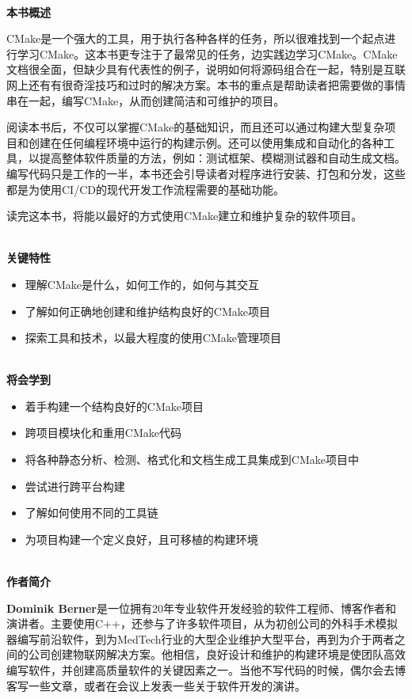 \documentclass[11pt,a4paper,UTF8]{book}
\begin{document}
\begin{sloppypar}
	\hspace*{\fill} \\ %
	\noindent\textbf{本书概述}
	
	CMake是一个强大的工具，用于执行各种各样的任务，所以很难找到一个起点进行学习CMake。这本书更专注于了最常见的任务，边实践边学习CMake。CMake文档很全面，但缺少具有代表性的例子，说明如何将源码组合在一起，特别是互联网上还有有很奇淫技巧和过时的解决方案。本书的重点是帮助读者把需要做的事情串在一起，编写CMake，从而创建简洁和可维护的项目。
	
	阅读本书后，不仅可以掌握CMake的基础知识，而且还可以通过构建大型复杂项目和创建在任何编程环境中运行的构建示例。还可以使用集成和自动化的各种工具，以提高整体软件质量的方法，例如：测试框架、模糊测试器和自动生成文档。编写代码只是工作的一半，本书还会引导读者对程序进行安装、打包和分发，这些都是为使用CI/CD的现代开发工作流程需要的基础功能。
	
	读完这本书，将能以最好的方式使用CMake建立和维护复杂的软件项目。
	
	
	\hspace*{\fill} \\ %
	\noindent\textbf{关键特性}
	\begin{itemize}
		\item 理解CMake是什么，如何工作的，如何与其交互
		\item 了解如何正确地创建和维护结构良好的CMake项目
		\item 探索工具和技术，以最大程度的使用CMake管理项目
	\end{itemize}

	\hspace*{\fill} \\ %
	\noindent\textbf{将会学到}
	\begin{itemize}
		\item 着手构建一个结构良好的CMake项目
		\item 跨项目模块化和重用CMake代码
		\item 将各种静态分析、检测、格式化和文档生成工具集成到CMake项目中
		\item 尝试进行跨平台构建
		\item 了解如何使用不同的工具链
		\item 为项目构建一个定义良好，且可移植的构建环境
	\end{itemize}
	
	\hspace*{\fill} \\ %
	\noindent\textbf{作者简介}
	
	\textbf{Dominik Berner}是一位拥有20年专业软件开发经验的软件工程师、博客作者和演讲者。主要使用C++，还参与了许多软件项目，从为初创公司的外科手术模拟器编写前沿软件，到为MedTech行业的大型企业维护大型平台，再到为介于两者之间的公司创建物联网解决方案。他相信，良好设计和维护的构建环境是使团队高效编写软件，并创建高质量软件的关键因素之一。当他不写代码的时候，偶尔会去博客写一些文章，或者在会议上发表一些关于软件开发的演讲。
	

\end{sloppypar}
\end{document}
